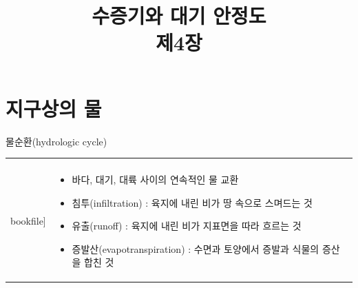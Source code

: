 \title[]{수증기와 대기 안정도 \\ \small{제4장}}

\begin{frame}[plain] %
	\titlepage
\end{frame}


\begin{frame}[plain] %
	\ccpage
\end{frame}


\section{지구상의 물}


\begin{frame}[t]{물순환(hydrologic cycle)}
	\begin{tabular}{ll}
		\begin{minipage}[t]{0.550\textwidth}
			\begin{figure}[t]
				\texttt{[image: \\bookfile]}
			\end{figure}
		\end{minipage}	
		&
		\begin{minipage}[t]{0.4\textwidth} \scriptsize
			\begin{itemize}
				\item 바다, 대기, 대륙 사이의 연속적인 물 교환
				\item 침투(infiltration) : 육지에 내린 비가 땅 속으로 스며드는 것
				\item 유출(runoff) : 육지에 내린 비가 지표면을 따라 흐르는 것
				\item 증발산(evapotranspiration) : 수면과 토양에서 증발과 식물의 증산을 합친 것
			\end{itemize}

		\end{minipage}
	\end{tabular}
\end{frame}




